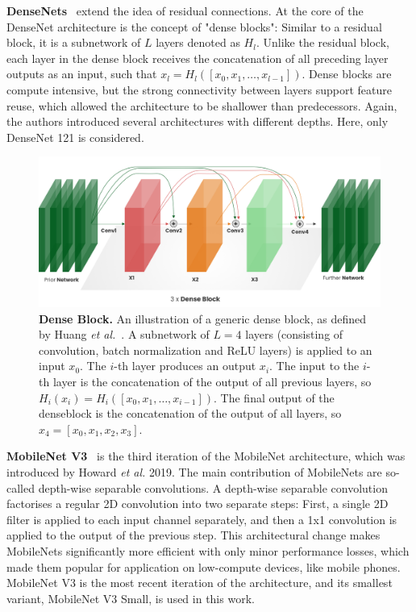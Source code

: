 \documentclass[a4paper]{article}
\begin{document}
\textbf{DenseNets}~\cite{densenet} extend the idea of residual connections. At
the core of the DenseNet architecture is the concept of "dense blocks": Similar
to a residual block, it is a subnetwork of $L$ layers denoted as $H_l$. Unlike
the residual block, each layer in the dense block receives the concatenation of
all preceding layer outputs as an input, such that $x_l = H_l([x_0, x_1, \dots,
x_{l-1}])$. Dense blocks are compute intensive, but the strong connectivity
between layers support feature reuse, which allowed the architecture to be
shallower than predecessors. Again, the authors introduced several architectures
with different depths. Here, only DenseNet 121 is considered.

\begin{figure}
  \centering
  \includegraphics[width=.8\textwidth]{./figures/densenet.png}
  \caption{\textbf{Dense Block.} An illustration of a generic dense block, as
    defined by Huang \textit{et al.}~\cite{densenet}. A subnetwork of $L=4$ layers
    (consisting of convolution, batch normalization and ReLU layers) is applied
    to an input $x_0$. The $i$-th layer produces an output $x_i$. The input to
    the $i$-th layer is the concatenation of the output of all previous layers,
    so $H_i(x_i) = H_i([x_0, x_1, \dots, x_{i-1}])$. The final output of the
    denseblock is the concatenation of the output of all layers, so $x_4 = [x_0,
  x_1, x_2, x_3]$. }
  \label{fig:denseblock}
\end{figure}

\textbf{MobileNet V3}~\cite{mobilenetv3} is the third iteration of the MobileNet
architecture, which was introduced by Howard \textit{et al.} 2019. The main contribution
of MobileNets are so-called depth-wise separable convolutions. A depth-wise
separable convolution factorises a regular 2D convolution into two separate
steps: First, a single 2D filter is applied to each input channel separately,
and then a 1x1 convolution is applied to the output of the previous step. This
architectural change makes MobileNets significantly more efficient with only
minor performance losses, which made them popular for application on low-compute
devices, like mobile phones. MobileNet V3 is the most recent iteration of the
architecture, and its smallest variant, MobileNet V3 Small, is used in this
work.
\end{document}
